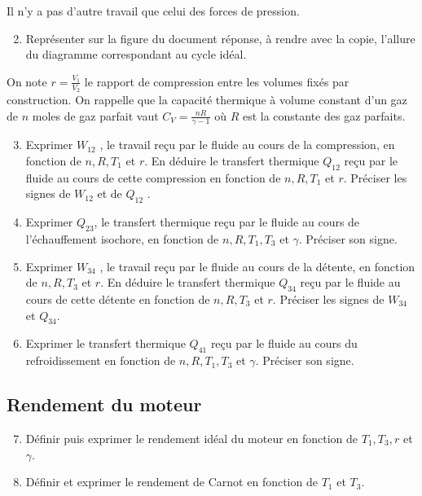 \documentclass[a4paper, 12pt, garamond]{book}
\begin{document}
Il n'y a pas d'autre travail que celui des forces de pression.

\begin{enumerate}
	\setcounter{enumi}{1}
	\item
	      Représenter sur la figure du document réponse, à rendre avec la copie,
	      l'allure du diagramme correspondant au cycle idéal.
\end{enumerate}

On note \(r = \frac{V_1}{V_2}\) le rapport de compression entre les
volumes fixés par construction. On rappelle que la capacité thermique à
volume constant d'un gaz de \(n\) moles de gaz parfait vaut
\(C_V=\frac{nR}{\gamma -1}\) où \(R\) est la constante des gaz parfaits.

\begin{enumerate}
	\setcounter{enumi}{2}
	\item
	      Exprimer \(W_{12}\) , le travail reçu par le fluide au cours de la
	      compression, en fonction de \(n, R, T_1\) et \(r\). En déduire le
	      transfert thermique \(Q_{12}\) reçu par le fluide au cours de cette
	      compression en fonction de \(n, R, T_1\) et \(r\). Préciser les signes
	      de \(W_{12}\) et de \(Q_{12}\) .
	\item
	      Exprimer \(Q_{23}\), le transfert thermique reçu par le fluide au
	      cours de l'échauffement isochore, en fonction de \(n, R, T_1, T_3\) et
	      \(\gamma\). Préciser son signe.
	\item
	      Exprimer \(W_{34}\) , le travail reçu par le fluide au cours de la
	      détente, en fonction de \(n, R, T_3\) et \(r\). En déduire le
	      transfert thermique \(Q_{34}\) reçu par le fluide au cours de cette
	      détente en fonction de \(n, R, T_3\) et \(r\). Préciser les signes de
	      \(W_{34}\) et \(Q_{34}\).
	\item
	      Exprimer le transfert thermique \(Q_{41}\) reçu par le fluide au cours
	      du refroidissement en fonction de \(n, R, T_1 , T_3\) et \(\gamma\).
	      Préciser son signe.
\end{enumerate}

\subsection{Rendement du moteur}

\begin{enumerate}
	\setcounter{enumi}{6}
	\item
	      Définir puis exprimer le rendement idéal du moteur en fonction de
	      \(T_1 , T_3 , r\) et \(\gamma\).
	\item
	      Définir et exprimer le rendement de Carnot en fonction de \(T_1\) et
	      \(T_3\).
\end{enumerate}
\end{document}
